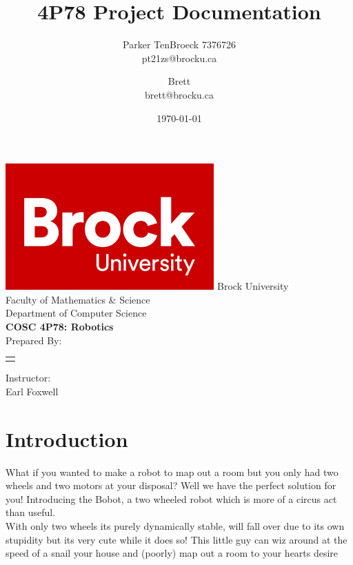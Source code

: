 \documentclass[12pt]{article}
\begin{document}
\title{4P78 Project Documentation}
\author{
    Parker TenBroeck 7376726\\
    pt21zs@brocku.ca
    \and
    Brett \\
    brett@brocku.ca
}
\date{\today}

\makeatletter
\begin{titlepage}
	\def \LOGOPATH {brock.jpg}
	\def \UNIVERSITY {Brock University}
	\def \FACULTY {Faculty of Mathematics \& Science}
	\def \DEPARTMENT {Department of Computer Science}
	\def \COURSETITLE {COSC 4P78: Robotics}
	\def \SUPERVISOR {Earl Foxwell}
	
	
	\vfill
	\begin{center}
		\includegraphics[width=0.6\textwidth]{brock.jpg}
		\fontsize{14pt}{14pt}\selectfont
		\vfill
		\UNIVERSITY \\
		\FACULTY \\
		\DEPARTMENT \\
		\vfill
		\fontsize{18pt}{18pt}\selectfont
		\textbf{\COURSETITLE} \\[0.5cm]
		\textbf{\@title}
		\vfill
		\fontsize{14pt}{14pt}\selectfont
		Prepared By: \\[0.5cm]
		
		\begin{tabular}[t]{c}
			\@author
		\end{tabular}\par
	
	    \vfill
		Instructor: \\
		\SUPERVISOR
		\vfill
		\@date
	\end{center}
\end{titlepage}
\makeatother

\tableofcontents
\newpage

\section{Introduction}
What if you wanted to make a robot to map out a room but you only had two wheels and two motors at your disposal? Well we have the perfect solution for you! Introducing the Bobot, a two wheeled robot which is more of a circus act than useful. \\
With only two wheels its purely dynamically stable, will fall over due to its own stupidity but its very cute while it does so! This little guy can wiz around at the speed of a snail your house and (poorly) map out a room to your hearts desire
\end{document}
